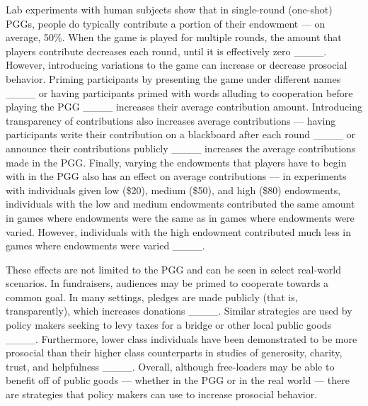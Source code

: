 Lab experiments with human subjects show that in single-round (one-shot) PGGs, people do typically contribute a portion of their endowment — on average, 50\%. When the game is played for multiple rounds, the amount that players contribute decreases each round, until it is effectively zero ____. However, introducing variations to the game can increase or decrease prosocial behavior. Priming participants by presenting the game under different names ____ or having participants primed with words alluding to cooperation before playing the PGG ____ increases their average contribution amount. Introducing transparency of contributions also increases average contributions — having participants write their contribution on a blackboard after each round ____ or announce their contributions publicly ____ increases the average contributions made in the PGG. Finally, varying the endowments that players have to begin with in the PGG also has an effect on average contributions — in experiments with individuals given low (\$20), medium (\$50), and high (\$80) endowments, individuals with the low and medium endowments contributed the same amount in games where endowments were the same as in games where endowments were varied. However, individuals with the high endowment contributed much less in games where endowments were varied ____.

These effects are not limited to the PGG and can be seen in select real-world scenarios. In fundraisers, audiences may be primed to cooperate towards a common goal. In many settings, pledges are made publicly (that is, transparently), which increases donations ____. Similar strategies are used by policy makers seeking to levy taxes for a bridge or other local public goods ____. Furthermore, lower class individuals have been demonstrated to be more prosocial than their higher class counterparts in studies of generosity, charity, trust, and helpfulness ____. Overall, although free-loaders may be able to benefit off of public goods — whether in the PGG or in the real world — there are strategies that policy makers can use to increase prosocial behavior.



%